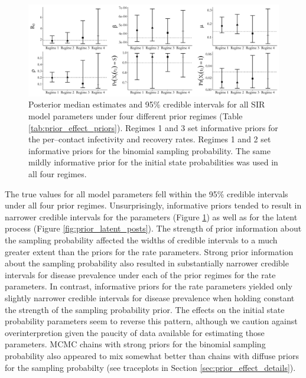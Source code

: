 \begin{figure}[htbp]
	\centering
	\includegraphics[width=\linewidth]{figures/prior_effect_credints.pdf}
	\caption{Posterior median estimates and 95\% credible intervals for all SIR model parameters under four different prior regimes (Table \ref{tab:prior_effect_priors}). Regimes 1 and 3 set informative priors for the per--contact infectivity and recovery rates. Regimes 1 and 2 set informative priors for the binomial sampling probability. The same mildly informative prior for the initial state probabilities was used in all four regimes.}
	\label{fig:prior_credints}
\end{figure}

The true values for all model parameters fell within the 95\% credible intervals under all four prior regimes. Unsurprisingly, informative priors tended to result in narrower credible intervals for the parameters (Figure \ref{fig:prior_credints}) as well as for the latent process (Figure \ref{fig:prior_latent_posts}). The strength of prior information about the sampling probability affected the widths of credible intervals to a much greater extent than the priors for the rate parameters. Strong prior information about the sampling probability also resulted in substantially narrower credible intervals for disease prevalence under each of the prior regimes for the rate parameters. In contrast, informative priors for the rate parameters yielded only slightly narrower credible intervals for disease prevalence when holding constant the strength of the sampling probability prior. The effects on the initial state probability parameters seem to reverse this pattern, although we caution against overinterpretion given the paucity of data available for estimating those parameters. MCMC chains with strong priors for the binomial sampling probability also appeared to mix somewhat better than chains with diffuse priors for the sampling probabilty (see traceplots in Section \ref{sec:prior_effect_details}).

